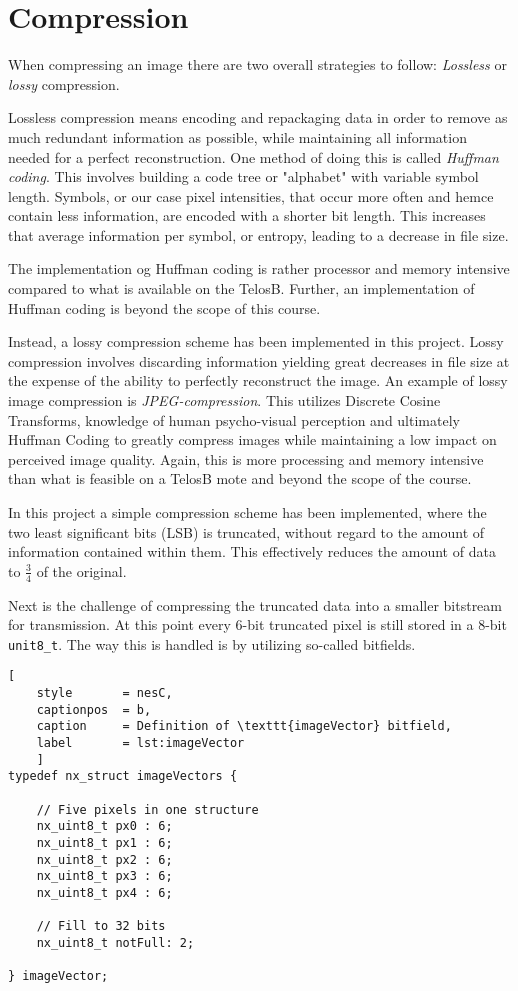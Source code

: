 \section{Compression}
When compressing an image there are two overall strategies to follow:
\emph{Lossless} or \emph{lossy} compression.

Lossless compression means encoding and repackaging data in order to remove as much redundant information as possible, while maintaining all information needed for a perfect reconstruction. 
One method of doing this is called \emph{Huffman coding}.
This involves building a code tree or "alphabet" with variable symbol length.
Symbols, or our case pixel intensities, that occur more often and hemce contain less information, are encoded with a shorter bit length. 
This increases that average information per symbol, or entropy, leading to a decrease in file size.

The implementation og Huffman coding is rather processor and memory intensive compared to what is available on the TelosB.
Further, an implementation of Huffman coding is beyond the scope of this course.

Instead, a lossy compression scheme has been implemented in this project.
Lossy compression involves discarding information yielding great decreases in file size at the expense of the ability to perfectly reconstruct the image.
An example of lossy image compression is \emph{JPEG-compression}.
This utilizes Discrete Cosine Transforms, knowledge of human psycho-visual perception and ultimately Huffman Coding to greatly compress images while maintaining a low impact on perceived image quality.
Again, this is more processing and memory intensive than what is feasible on a TelosB mote and beyond the scope of the course.

In this project a simple compression scheme has been implemented, where the two least significant  bits (LSB) is truncated, without regard to the amount of information contained within them.
This effectively reduces the amount of data to $ \frac{3}{4} $ of the original. 

Next is the challenge of compressing the truncated data into a smaller bitstream for transmission.
At this point every 6-bit truncated pixel is still stored in a 8-bit \texttt{unit8\_t}.
The way this is handled is by utilizing so-called bitfields.


\begin{lstlisting}[
	style		= nesC, 
	captionpos	= b, 
	caption		= Definition of \texttt{imageVector} bitfield,
	label		= lst:imageVector
	]
typedef nx_struct imageVectors {
	
	// Five pixels in one structure
	nx_uint8_t px0 : 6;
	nx_uint8_t px1 : 6;
	nx_uint8_t px2 : 6;
	nx_uint8_t px3 : 6;
	nx_uint8_t px4 : 6;
	
	// Fill to 32 bits
	nx_uint8_t notFull: 2;
	
} imageVector;

\end{lstlisting}



